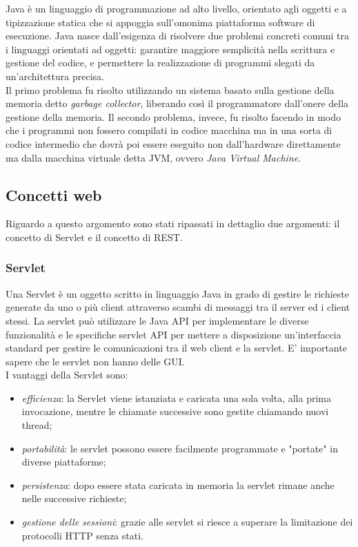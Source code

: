 Java è un linguaggio di programmazione ad alto livello, orientato agli oggetti e a tipizzazione statica che si appoggia sull'omonima piattaforma software di esecuzione. Java nasce dall'esigenza di risolvere due problemi concreti comuni tra i linguaggi orientati ad oggetti: garantire maggiore semplicità nella scrittura e gestione del codice, e permettere la realizzazione di programmi slegati da un'architettura precisa.\\
Il primo problema fu risolto utilizzando un sistema basato sulla gestione della memoria detto \textit{garbage collector}, liberando così il programmatore dall'onere della gestione della memoria. Il secondo problema, invece, fu risolto facendo in modo che i programmi non fossero compilati in codice macchina ma in una sorta di codice intermedio che dovrà poi essere eseguito non dall'hardware direttamente ma dalla macchina virtuale detta JVM, ovvero \textit{Java Virtual Machine}.\\

\subsection{Concetti web}

Riguardo a questo argomento sono stati ripassati in dettaglio due argomenti: il concetto di Servlet e il concetto di REST.

\subsubsection{Servlet}

Una Servlet è un oggetto scritto in linguaggio Java in grado di gestire le richieste generate da uno o più client attraverso scambi di messaggi tra il server ed i client stessi. La servlet può utilizzare le Java API per implementare le diverse funzionalità e le specifiche servlet API per mettere a disposizione un'interfaccia standard per gestire le comunicazioni tra il web client e la servlet. E' importante sapere che le servlet non hanno delle GUI.\\
I vantaggi della Servlet sono:
\begin{itemize}
	\item \textit{efficienza}: la Servlet viene istanziata e caricata una sola volta, alla prima invocazione, mentre le chiamate successive sono gestite chiamando nuovi thread;
	\item \textit{portabilità}: le servlet possono essere facilmente programmate e "portate" in diverse piattaforme;
	\item \textit{persistenza}: dopo essere stata caricata in memoria la servlet rimane anche nelle successive richieste;
	\item \textit{gestione delle sessioni}: grazie alle servlet si riesce a superare la limitazione dei protocolli HTTP senza stati.
\end{itemize}

